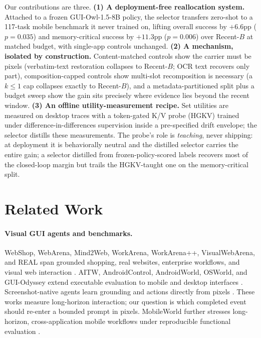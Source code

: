 \documentclass[letterpaper]{article} %
\newcommand{\hgkv}{\textsc{HGKV}}
\begin{document}
Our contributions are three.
\textbf{(1) A deployment-free reallocation system.} Attached to a frozen
GUI-Owl-1.5-8B policy, the selector transfers zero-shot to a 117-task
mobile benchmark it never trained on, lifting overall success by $+6.6$pp
($p{=}0.035$) and memory-critical success by $+11.3$pp ($p{=}0.006$) over
Recent-$B$ at matched budget, with single-app controls unchanged.
\textbf{(2) A mechanism, isolated by construction.} Content-matched
controls show the carrier must be pixels (verbatim-text restoration
collapses to Recent-$B$; OCR text recovers only part), composition-capped
controls show multi-slot recomposition is necessary (a $k{\le}1$ cap
collapses exactly to Recent-$B$), and a metadata-partitioned split plus a
budget sweep show the gain sits precisely where evidence lies beyond the
recent window.
\textbf{(3) An offline utility-measurement recipe.} Set utilities are
measured on desktop traces with a token-gated K/V probe (\hgkv) trained
under difference-in-differences supervision inside a pre-specified drift
envelope; the selector distills these measurements. The probe's role is
\emph{teaching}, never shipping: at deployment it is behaviorally neutral
and the distilled selector carries the entire gain; a selector distilled
from frozen-policy-scored labels recovers most of the closed-loop margin
but trails the \hgkv{}-taught one on the memory-critical split.

\section{Related Work}

\paragraph{Visual GUI agents and benchmarks.}
WebShop, WebArena, Mind2Web, WorkArena, WorkArena++, VisualWebArena, and REAL
span grounded shopping, real websites, enterprise workflows, and visual web
interaction \citep{yao2022webshop,zhou2024webarena,deng2023mind2web,
drouin2024workarena,boisvert2024workarenaplus,koh2024visualwebarena,
garg2025real}. AITW, AndroidControl, AndroidWorld, OSWorld, and GUI-Odyssey
extend executable evaluation to mobile and desktop interfaces
\citep{rawles2023aitw,li2024androidcontrol,rawles2025androidworld,
xie2024osworld,lu2025guiodyssey}. Screenshot-native agents learn grounding and
actions directly from pixels \citep{hong2024cogagent,cheng2024seeclick,
lin2025showui,xu2026mobileagent35}. These works measure long-horizon
interaction; our question is which completed event should re-enter a bounded
prompt in pixels.
MobileWorld further stresses long-horizon, cross-application mobile workflows
under reproducible functional evaluation \citep{kong2026mobileworld}.
\end{document}
